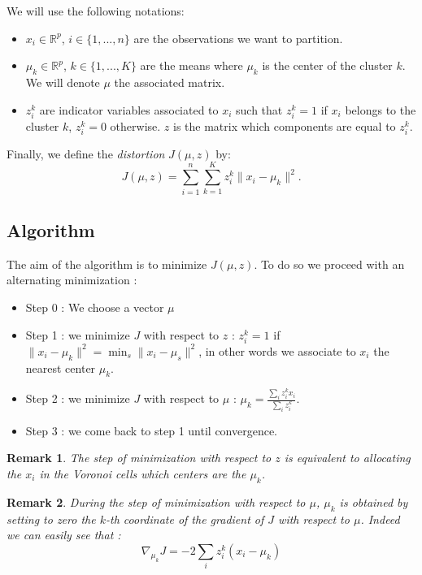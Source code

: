 \documentclass[12pt]{report}
\newtheorem{remarque}{Remark}[section]
\begin{document}
We will use the following notations: 
\begin{itemize}
\item $x_i \in  \mathbb{R}^p $, $i\in\{1,...,n\}$ are the observations we want to partition.
\item $\mu_k \in \mathbb{R}^p$, $k\in\{1,...,K\}$ are the means where $\mu_k$ is the center of the cluster $k$. We will denote $\mu$ the associated matrix.
\item $z_i^k$ are indicator variables associated to  $x_i$ such that $z_i^k=1$ if $x_i$ belongs to the cluster $k$, $z_i^k=0$ otherwise. $z$ is the matrix which components are equal to $z_i^k$.
\end{itemize}

Finally, we define the \textit{distortion} $J(\mu,z)$ by:
$$J(\mu,z)=\sum_{i=1}^n \sum_{k=1}^K z_i^k \| x_i-\mu_k \|^2.$$

\subsection{Algorithm}

The aim of the algorithm is to minimize $J(\mu,z)$. To do so we proceed with an alternating minimization :

\begin{itemize}
\item Step 0 : We choose a vector $\mu$
\item Step 1 : we minimize $J$ with respect to $z$ :  $z_i^k=1$ if $\parallel x_i-\mu_k\parallel^2 = \min_s\parallel x_i-\mu_s\parallel^2$, in other words we associate to $x_i$ the nearest center $\mu_k$.
\item Step 2 : we minimize $J$ with respect to $\mu$ :
  $\mu_k=\frac{\sum_i z_i^k x_i}{\sum_i z_i^k}$.
\item Step 3 : we come back to step 1 until convergence.
\end{itemize}

\begin{remarque} 
The step of minimization with respect to $z$ is equivalent to allocating the $x_i$ in the Voronoi cells which centers are the $\mu_k$.
\end{remarque}

\begin{remarque} 
During the step of minimization with respect to $\mu$, $\mu_k$ is obtained by setting to zero the $k$-th coordinate of the gradient of $J$ with respect to $\mu$. Indeed we can easily see that :
\begin{equation*}
\nabla_{\mu_k }J = -2\sum_i z_i^k(x_i-\mu_k)
\end{equation*}

\end{remarque}
\end{document}
